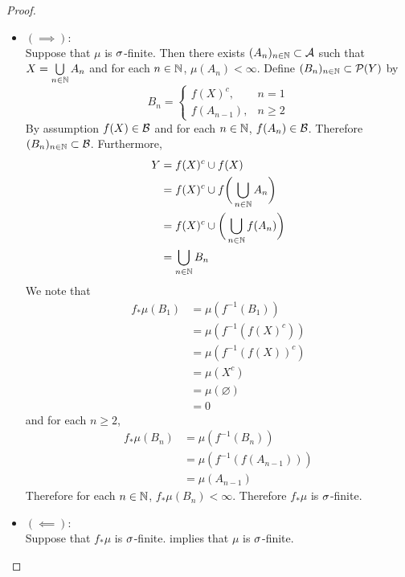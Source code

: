 \documentclass{book}
\begin{document}
\begin{proof}\
	\begin{itemize}
		\item $(\implies):$ \\
		Suppose that $\mu$ is $\sigma$-finite. Then there exists $(A_n)_{n \in \mathbb{N}} \subset \mathcal{A}$ such that $X = \bigcup\limits_{n \in \mathbb{N}} A_n$ and for each $n \in \mathbb{N}$, $\mu(A_n) < \infty$. Define $(B_n)_{n \in \mathbb{N}} \subset \mathcal{P}(Y)$ by 
		\[
		B_n = 
		\begin{cases}
			f(X)^c, & n = 1 \\
			f(A_{n-1}), & n \geq 2
		\end{cases}\]
		By assumption $f(X) \in \mathcal{B}$ and for each $n \in \mathbb{N}$, $f(A_n) \in \mathcal{B}$. Therefore $(B_n)_{n \in \mathbb{N}} \subset \mathcal{B}$. Furthermore, 
		\begin{align*}
			Y
			& = f(X)^c \cup f(X) \\
			& =  f(X)^c \cup f\bigg( \bigcup_{n \in \mathbb{N}} A_n \bigg) \\
			& =  f(X)^c \cup \bigg( \bigcup_{n \in \mathbb{N}} f(A_n) \bigg) \\
			& =  \bigcup_{n \in \mathbb{N}} B_n \\
		\end{align*}
		We note that 
		\begin{align*}
			f_*\mu(B_1)
			& = \mu(f^{-1}(B_1)) \\
			& = \mu(f^{-1} (f(X)^c)) \\
			& = \mu(f^{-1}(f(X))^c) \\
			& = \mu(X^c) \\
			& = \mu(\varnothing) \\
			& = 0
		\end{align*}
		and for each $n \geq 2$, 
		\begin{align*}
			f_*\mu(B_n) 
			& = \mu(f^{-1}(B_n)) \\
			& = \mu(f^{-1}(f(A_{n-1}))) \\ 
			& = \mu(A_{n-1})
		\end{align*}
		Therefore for each $n \in \mathbb{N}$, $f_* \mu(B_n) < \infty$. Therefore $f_*\mu$ is $\sigma$-finite.
		\item $(\impliedby):$ \\
		Suppose that $f_*\mu$ is $\sigma$-finite.  implies that $\mu$ is $\sigma$-finite.
	\end{itemize}
\end{proof}
\end{document}

